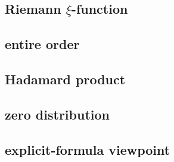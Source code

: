 

\subsection{Riemann \texorpdfstring{\(\xi\)}{m}-function}
\label{b3:subsec:260601}

\subsection{entire order}
\label{b3:subsec:260602}

\subsection{Hadamard product}
\label{b3:subsec:260603}

\subsection{zero distribution}
\label{b3:subsec:260604}

\subsection{explicit-formula viewpoint}
\label{b3:subsec:260605}


